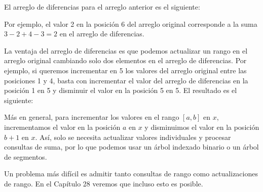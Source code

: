 El arreglo de diferencias para el arreglo anterior es el siguiente:
\begin{center}
\end{center}

Por ejemplo, el valor 2 en la posición 6 del arreglo original
corresponde a la suma $3-2+4-3=2$ en el arreglo de diferencias.

La ventaja del arreglo de diferencias es
que podemos actualizar un rango
en el arreglo original cambiando solo
dos elementos en el arreglo de diferencias.
Por ejemplo, si queremos
incrementar en 5 los valores del arreglo original
entre las posiciones 1 y 4,
basta con incrementar el
valor del arreglo de diferencias en la posición 1 en 5
y disminuir el valor en la posición 5 en 5.
El resultado es el siguiente:

\begin{center}
\end{center}

Más en general, para incrementar los valores
en el rango $[a,b]$ en $x$,
incrementamos el valor en la posición $a$ en $x$
y disminuimos el valor en la posición $b+1$ en $x$.
Así, solo se necesita actualizar valores individuales
y procesar consultas de suma,
por lo que podemos usar un árbol indexado binario o un árbol de segmentos.

Un problema más difícil es admitir tanto
consultas de rango como actualizaciones de rango.
En el Capítulo 28 veremos que incluso esto es posible.
